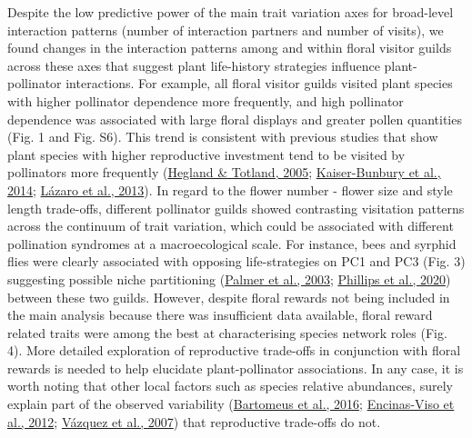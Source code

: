 \documentclass[
  12pt,
  a4paper,
]{article}
\begin{document}
Despite the low predictive power of the main trait variation axes for broad-level interaction patterns (number of interaction partners and number of visits), we found changes in the interaction patterns among and within floral visitor guilds across these axes that suggest plant life-history strategies influence plant-pollinator interactions. For example, all floral visitor guilds visited plant species with higher pollinator dependence more frequently, and high pollinator dependence was associated with large floral displays and greater pollen quantities (Fig. 1 and Fig. S6). This trend is consistent with previous studies that show plant species with higher reproductive investment tend to be visited by pollinators more frequently (\protect\hyperlink{ref-hegland2005}{Hegland \& Totland, 2005}; \protect\hyperlink{ref-kaiser2014}{Kaiser-Bunbury et al., 2014}; \protect\hyperlink{ref-lazaro2013}{Lázaro et al., 2013}). In regard to the flower number - flower size and style length trade-offs, different pollinator guilds showed contrasting visitation patterns across the continuum of trait variation, which could be associated with different pollination syndromes at a macroecological scale. For instance, bees and syrphid flies were clearly associated with opposing life-strategies on PC1 and PC3 (Fig. 3) suggesting possible niche partitioning (\protect\hyperlink{ref-palmer2003}{Palmer et al., 2003}; \protect\hyperlink{ref-phillips2020}{Phillips et al., 2020}) between these two guilds. However, despite floral rewards not being included in the main analysis because there was insufficient data available, floral reward related traits were among the best at characterising species network roles (Fig. 4). More detailed exploration of reproductive trade-offs in conjunction with floral rewards is needed to help elucidate plant-pollinator associations. In any case, it is worth noting that other local factors such as species relative abundances, surely explain part of the observed variability (\protect\hyperlink{ref-bartomeus2016}{Bartomeus et al., 2016}; \protect\hyperlink{ref-encinas2012}{Encinas-Viso et al., 2012}; \protect\hyperlink{ref-vazquez2007}{Vázquez et al., 2007}) that reproductive trade-offs do not.
\end{document}
